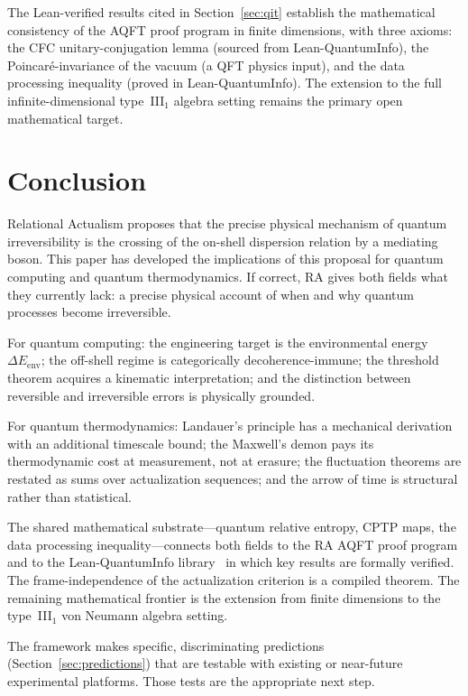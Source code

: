 \documentclass[11pt,a4paper]{article}
\theoremstyle{plain}
\theoremstyle{definition}
\theoremstyle{remark}
\begin{document}
The Lean-verified results cited in Section~\ref{sec:qit} establish the
mathematical consistency of the AQFT proof program in finite dimensions, with three
axioms: the CFC unitary-conjugation lemma (sourced from Lean-QuantumInfo), the
Poincar\'{e}-invariance of the vacuum (a QFT physics input), and the data
processing inequality (proved in Lean-QuantumInfo). The extension to the full
infinite-dimensional type~III$_1$ algebra setting remains the primary open
mathematical target.

\section{Conclusion}

Relational Actualism proposes that the precise physical mechanism of quantum
irreversibility is the crossing of the on-shell dispersion relation by a mediating
boson. This paper has developed the implications of this proposal for quantum
computing and quantum thermodynamics. If correct, RA gives both fields what they
currently lack: a precise physical account of when and why quantum processes become
irreversible.

For quantum computing: the engineering target is the environmental energy
$\Delta E_{\mathrm{env}}$; the off-shell regime is categorically
decoherence-immune; the threshold theorem acquires a kinematic interpretation; and
the distinction between reversible and irreversible errors is physically grounded.

For quantum thermodynamics: Landauer's principle has a mechanical derivation with
an additional timescale bound; the Maxwell's demon pays its thermodynamic cost at
measurement, not at erasure; the fluctuation theorems are restated as sums over
actualization sequences; and the arrow of time is structural rather than
statistical.

The shared mathematical substrate---quantum relative entropy, CPTP maps, the data
processing inequality---connects both fields to the RA AQFT proof program and to
the Lean-QuantumInfo library~\citep{Meiburg2025LQI} in which key results are
formally verified. The frame-independence of the actualization criterion is a
compiled theorem. The remaining mathematical frontier is the extension from finite
dimensions to the type~III$_1$ von Neumann algebra setting.

The framework makes specific, discriminating predictions (Section~\ref{sec:predictions})
that are testable with existing or near-future experimental platforms. Those tests
are the appropriate next step.
\end{document}
